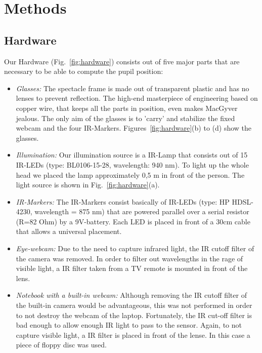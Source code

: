 \section{Methods}\label{methods}

\subsection{Hardware}

Our Hardware (Fig.~\ref{fig:hardware}) consists out of five major parts that are necessary to be able to compute the pupil position:

\begin{itemize}
  \item \textit{Glasses:} 
  The spectacle frame is made out of transparent plastic and has no lenses to prevent reflection. 
  The high-end masterpiece of engineering based on copper wire, that keeps all the parts in position, even makes MacGyver jealous.
  The only aim of the glasses is to 'carry' and stabilize the fixed webcam and the four IR-Markers. Figures~\ref{fig:hardware}(b) to (d) show the glasses.

\item \textit{Illumination:}
  Our illumination source is a IR-Lamp that consists out of 15 IR-LEDs (type: BL0106-15-28, wavelength: 940 nm). To light up the whole head we placed the lamp approximately 0,5 m in front of the person. The light source is shown in Fig.~\ref{fig:hardware}(a).

  \item \textit{IR-Markers:} 
The IR-Markers consist basically of IR-LEDs (type: HP HDSL-4230, wavelength = 875 nm) that are powered parallel over a serial resistor (R=82 Ohm) by a 9V-battery. Each LED is placed in front of a 30cm cable that allows a universal placement. 

  \item \textit{Eye-webcam:} Due to the need to capture infrared light, the IR cutoff filter of the camera was removed. In order to filter out wavelengths in the rage of visible light, a IR filter taken from a TV remote is mounted in front of the lens.

  \item \textit{Notebook with a built-in webcam:} Although removing the IR cutoff filter of the built-in camera would be advantageous, this was not performed in order to not destroy the webcam of the laptop. 
    Fortunately, the IR cut-off filter is bad enough to allow enough IR light to pass to the sensor. 
    Again, to not capture visible light, a IR filter is placed in front of the lense. In this case a piece of floppy disc was used.


\end{itemize}

